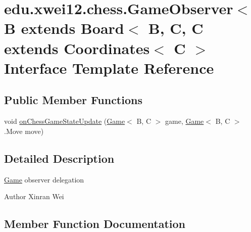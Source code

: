 \hypertarget{interfaceedu_1_1xwei12_1_1chess_1_1_game_observer}{}\section{edu.\+xwei12.\+chess.\+Game\+Observer$<$ B extends Board$<$ B, C, C extends Coordinates$<$ C $>$ Interface Template Reference}
\label{interfaceedu_1_1xwei12_1_1chess_1_1_game_observer}
\subsection*{Public Member Functions}
\begin{DoxyCompactItemize}
\item 
void \hyperlink{interfaceedu_1_1xwei12_1_1chess_1_1_game_observer_a2e9a7aa8cc0ec4b0642293dc8b384521}{on\+Chess\+Game\+State\+Update} (\hyperlink{classedu_1_1xwei12_1_1chess_1_1_game}{Game}$<$ B, C $>$ game, \hyperlink{classedu_1_1xwei12_1_1chess_1_1_game}{Game}$<$ B, C $>$.Move move)
\end{DoxyCompactItemize}


\subsection{Detailed Description}
\hyperlink{classedu_1_1xwei12_1_1chess_1_1_game}{Game} observer delegation \begin{DoxyAuthor}{Author}
Xinran Wei 
\end{DoxyAuthor}


\subsection{Member Function Documentation}
